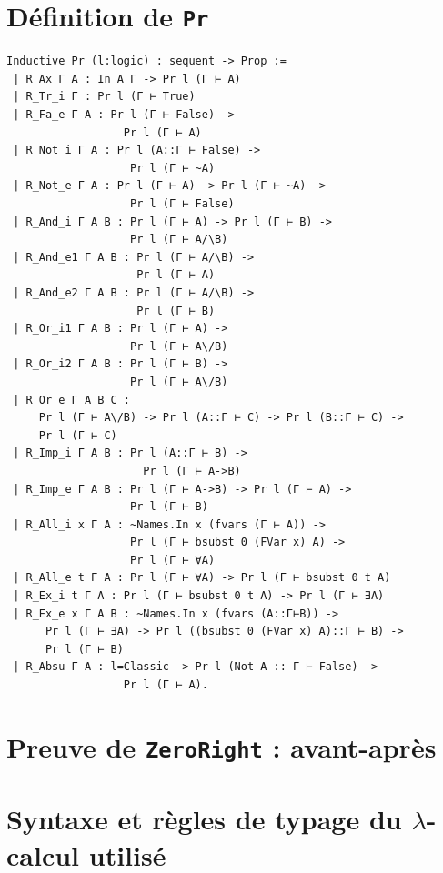 \documentclass[a4paper]{article}
\theoremstyle{remark}
\theoremstyle{remark}
\theoremstyle{remark}
\theoremstyle{definition}
\theoremstyle{definition}
\theoremstyle{definition}
\begin{document}
\appendix
\newpage

\section{Définition de \texttt{Pr}} \label{pr}

\begin{verbatim}
Inductive Pr (l:logic) : sequent -> Prop :=
 | R_Ax Γ A : In A Γ -> Pr l (Γ ⊢ A)
 | R_Tr_i Γ : Pr l (Γ ⊢ True)
 | R_Fa_e Γ A : Pr l (Γ ⊢ False) ->
                  Pr l (Γ ⊢ A)
 | R_Not_i Γ A : Pr l (A::Γ ⊢ False) ->
                   Pr l (Γ ⊢ ~A)
 | R_Not_e Γ A : Pr l (Γ ⊢ A) -> Pr l (Γ ⊢ ~A) ->
                   Pr l (Γ ⊢ False)
 | R_And_i Γ A B : Pr l (Γ ⊢ A) -> Pr l (Γ ⊢ B) ->
                   Pr l (Γ ⊢ A/\B)
 | R_And_e1 Γ A B : Pr l (Γ ⊢ A/\B) ->
                    Pr l (Γ ⊢ A)
 | R_And_e2 Γ A B : Pr l (Γ ⊢ A/\B) ->
                    Pr l (Γ ⊢ B)
 | R_Or_i1 Γ A B : Pr l (Γ ⊢ A) ->
                   Pr l (Γ ⊢ A\/B)
 | R_Or_i2 Γ A B : Pr l (Γ ⊢ B) ->
                   Pr l (Γ ⊢ A\/B)
 | R_Or_e Γ A B C :
     Pr l (Γ ⊢ A\/B) -> Pr l (A::Γ ⊢ C) -> Pr l (B::Γ ⊢ C) ->
     Pr l (Γ ⊢ C)
 | R_Imp_i Γ A B : Pr l (A::Γ ⊢ B) ->
                     Pr l (Γ ⊢ A->B)
 | R_Imp_e Γ A B : Pr l (Γ ⊢ A->B) -> Pr l (Γ ⊢ A) ->
                   Pr l (Γ ⊢ B)
 | R_All_i x Γ A : ~Names.In x (fvars (Γ ⊢ A)) ->
                   Pr l (Γ ⊢ bsubst 0 (FVar x) A) ->
                   Pr l (Γ ⊢ ∀A)
 | R_All_e t Γ A : Pr l (Γ ⊢ ∀A) -> Pr l (Γ ⊢ bsubst 0 t A)
 | R_Ex_i t Γ A : Pr l (Γ ⊢ bsubst 0 t A) -> Pr l (Γ ⊢ ∃A)
 | R_Ex_e x Γ A B : ~Names.In x (fvars (A::Γ⊢B)) ->
      Pr l (Γ ⊢ ∃A) -> Pr l ((bsubst 0 (FVar x) A)::Γ ⊢ B) ->
      Pr l (Γ ⊢ B)
 | R_Absu Γ A : l=Classic -> Pr l (Not A :: Γ ⊢ False) ->
                  Pr l (Γ ⊢ A).
\end{verbatim}



\section{Preuve de \texttt{ZeroRight} : avant-après}\label{beforeafter_zeroright}

\section{Syntaxe et règles de typage du $\lambda$-calcul utilisé}
\end{document}
